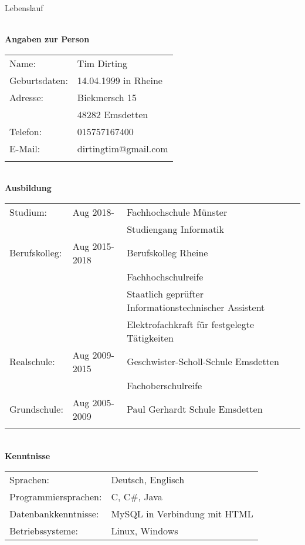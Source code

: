 \documentclass[12pt,twoside,a4paper]{scrlttr2}
\author{Tim Dirting}
\begin{document}
	
	\begin{letter}
		
		\begin{huge}
			Lebenslauf \newline
		\end{huge}
		\textbf{ \\ Angaben zur Person }
		
		\begin{onehalfspace}
			\begin{tabular}{ p{4.5cm} l  }
		    	\\ Name:        & Tim Dirting   \\ 
				 Geburtsdaten:  & 14.04.1999 in Rheine  \\  
				 Adresse: 		& Biekmersch 15 \\  
				 				& 48282 Emsdetten  \\  
				 Telefon:	    & 015757167400  \\  
				 E-Mail:		& dirtingtim@gmail.com  \\ \\ 
			\end{tabular}
		
		\textbf{ \\Ausbildung  }
		
			\begin{tabular}{  p{4.5cm} l l  }
			 \\Studium:     	  & Aug 2018-		& Fachhochschule Münster   \\  
			 					  &					& Studiengang Informatik  \\
			Berufskolleg:		  & Aug 2015-2018	& Berufskolleg Rheine \\
								  &					& Fachhochschulreife  \\ 	
								  &					& Staatlich geprüfter Informationstechnischer Assistent  \\  
								  &					& Elektrofachkraft für festgelegte Tätigkeiten \\
			Realschule:			  & Aug 2009-2015	& Geschwister-Scholl-Schule Emsdetten  \\  
								  &					&Fachoberschulreife \\
			Grundschule: 		  & Aug 2005-2009	& Paul Gerhardt Schule Emsdetten  \\ \\ 
			\end{tabular}
			
		\textbf{ \\Kenntnisse }
			
			\begin{tabular}{  p{4.5cm} l  }
				\\ Sprachen: 				& Deutsch, Englisch \\
				Programmiersprachen:     	& C, C\#, Java  \\  
				Datenbankkenntnisse: 		& MySQL in Verbindung mit HTML	\\
				Betriebssysteme:   			& Linux, Windows	    
								

\end{tabular}
\end{onehalfspace}
\end{letter}
\end{document}
